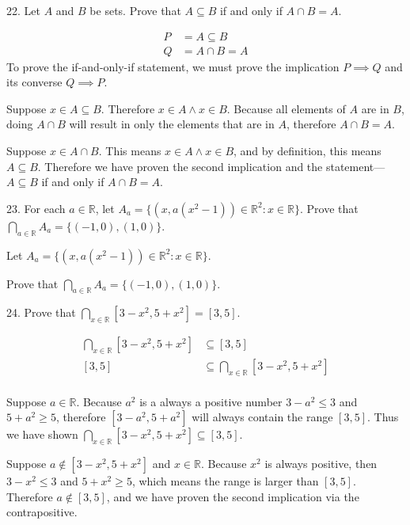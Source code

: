 \documentclass{idrisMemo}
\newcommand{\set}[1]{\{#1\}}
\begin{document}
\begin{prooflist}{22. Let $A$ and $B$ be sets. Prove that $A \subseteq B$ if and only if $A \cap B=A$.}
\item
    \begin{align*}
        P &= A \subseteq B\\
        Q &= A \cap B = A
\end{align*}
To prove the if-and-only-if statement, we must prove the implication $P\implies
Q$ and its converse $Q\implies P$.
\item Suppose $x\in A\subseteq B$. Therefore $x\in A \land x\in B$. Because all
    elements of $A$ are in $B$, doing $A\cap B$ will result in only the
    elements that are in $A$, therefore $A\cap B=A$.
\item Suppose $x\in A\cap B$.  This means $x\in A \land x\in B$, and by
    definition, this means $A\subseteq B$. Therefore we have proven the second
    implication and the statement---$A \subseteq B$ if and only if $A \cap B=A$.
\end{prooflist}

\begin{prooflist}{23. For each $a \in \mathbb{R}$, let $A_a=\set{(x,
a(x^2-1)) \in \mathbb{R}^2: x \in \mathbb{R}}$.
Prove that $\bigcap_{a \in \mathbb{R}} A_a=\set{(-1,0),(1,0)}$.}
\item
Let $A_a=\set{(x, a(x^2-1)) \in \mathbb{R}^2: x \in \mathbb{R}}$.
\item Prove that $\bigcap_{a \in \mathbb{R}} A_a=\set{(-1,0),(1,0)}$.
\end{prooflist}

\begin{prooflist}{24. Prove that $\bigcap_{x \in \mathbb{R}}\left[3-x^2, 5+x^2\right]=[3,5]$.}
\item
\begin{align*}
\bigcap_{x\in\mathbb{R}}\left[3-x^2, 5+x^2\right]&\subseteq [3,5]\\
[3,5] &\subseteq \bigcap_{x \in \mathbb{R}}\left[3-x^2, 5+x^2\right] \\
\end{align*}
\item
Suppose $a\in\mathbb{R}$. Because $a^2$ is a always a positive number $3-a^2\leq3$
and $5+a^2\geq 5$, therefore $[3-a^2, 5+a^2]$ will always contain the range $[3,
5]$. Thus we have shown
$\bigcap_{x\in\mathbb{R}}\left[3-x^2, 5+x^2\right]\subseteq [3,5]$.
\item Suppose $a \notin [3-x^2, 5+x^2]$ and $x\in \mathbb{R}$. Because $x^2$ is
    always positive, then $3-x^2\leq3$ and $5+x^2\geq 5$, which means the range
    is larger than $[3, 5]$. Therefore $a \notin [3, 5]$, and we have proven the
    second implication via the contrapositive.
\end{prooflist}
\end{document}
